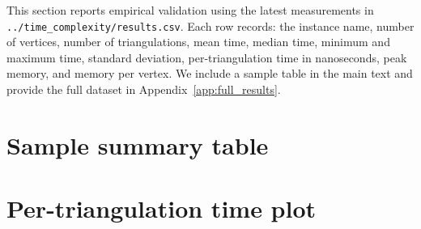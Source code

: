 \documentclass[12pt,a4paper]{report}
\theoremstyle{definition}
\theoremstyle{remark}
\begin{document}
This section reports empirical validation using the latest measurements in
\texttt{../time\_complexity/results.csv}. Each row records: the instance name, number of
vertices, number of triangulations, mean time, median time, minimum and maximum time,
standard deviation, per-triangulation time in nanoseconds, peak memory, and memory per
vertex. We include a sample table in the main text and provide the full dataset in
Appendix~\ref{app:full_results}.

\section{Sample summary table}


\section{Per-triangulation time plot}

\end{document}
